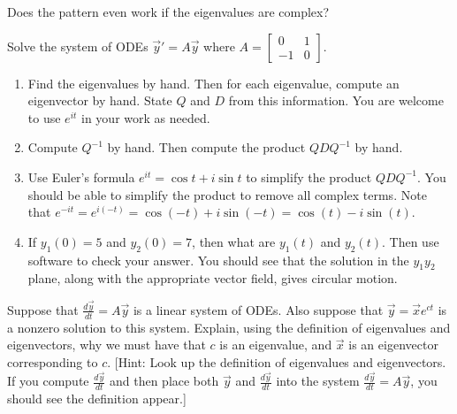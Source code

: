 Does the pattern even work if the eigenvalues are complex?
\begin{problem*}[Optional]
 Solve the system of ODEs $\vec y '=A\vec y$ where 
$A
=\begin{bmatrix}
  0&1\\-1&0
 \end{bmatrix}
$. 
\begin{enumerate}
 \item Find the eigenvalues by hand.  Then for each eigenvalue, compute an eigenvector by hand. State $Q$ and $D$ from this information.  You are welcome to use $e^{it}$ in your work as needed. 
 \item Compute $Q^{-1}$ by hand.  Then compute the product $QDQ^{-1}$ by hand.
 \item 
{}%
Use Euler's formula $e^{it} = \cos t +i\sin t$ to simplify the product $QDQ^{-1}$. You should be able to simplify the product to remove all complex terms. Note that $e^{-it}=e^{i(-t)} = \cos(-t) +i\sin(-t)=\cos(t)-i\sin(t)$.
 \item 
{}%
If $y_1(0)=5$ and $y_2(0)=7$, then what are $y_1(t)$ and $y_2(t)$. Then use software to check your answer. You should see that the solution in the $y_1y_2$ plane, along with the appropriate vector field, gives circular motion.
\end{enumerate}

\end{problem*}

\begin{problem}
Suppose that $\frac{d\vec y}{dt} = A\vec y$ is a linear system of ODEs.  Also suppose that $\vec y=\vec x e^{ct}$ is a nonzero solution to this system. Explain, using the definition of eigenvalues and eigenvectors, why we must have that $c$ is an eigenvalue, and $\vec x$ is an eigenvector corresponding to $c$. [Hint:  Look up the definition of eigenvalues and eigenvectors.  If you compute $\frac{d\vec y}{dt}$ and then place both $\vec y$ and $\frac{d\vec y}{dt}$ into the system $\frac{d\vec y}{dt}= A\vec y$, you should see the definition appear.] 
\end{problem}













